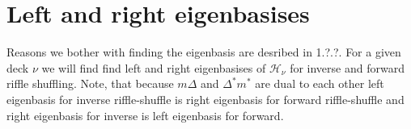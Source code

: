 \documentclass[a4paper, 12pt]{report}
\begin{document}
\chapter{Left and right eigenbasises}

Reasons we bother with finding the eigenbasis are desribed in 1.?.?. For a given deck $\nu$ 
we will find find left and right eigenbasises of $\mathcal{H}_\nu$ for inverse and forward riffle shuffling. 
Note, that because 
$m\Delta$ and $\Delta^*m^*$ are dual to each other left eigenbasis for inverse riffle-shuffle is right 
eigenbasis for forward riffle-shuffle and right eigenbasis for inverse is left eigenbasis for forward.
\end{document}
